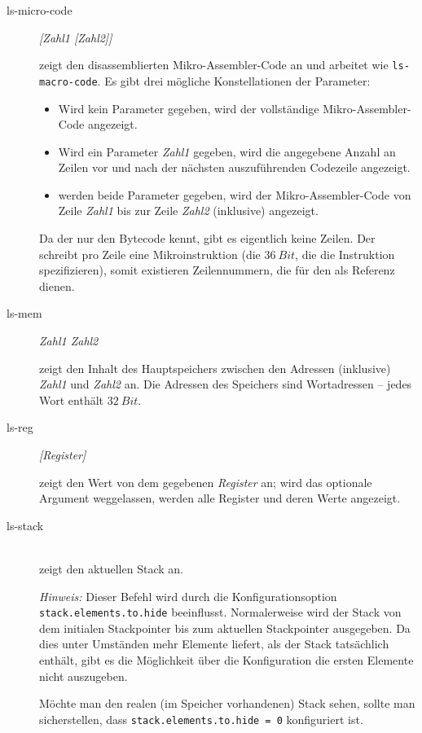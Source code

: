\begin{description}
\item[ls-micro-code] \emph{[Zahl1 [Zahl2]]}

  zeigt den disassemblierten Mikro-Assembler-Code an und arbeitet wie \texttt{ls-macro-code}. Es gibt drei mögliche Konstellationen der Parameter:
  \begin{itemize}
  \item Wird kein Parameter gegeben, wird der vollständige Mikro-Assembler-Code angezeigt.
  \item Wird ein Parameter \emph{Zahl1} gegeben, wird die angegebene Anzahl an Zeilen vor und nach der nächsten auszuführenden Codezeile angezeigt.
  \item werden beide Parameter gegeben, wird der Mikro-Assembler-Code von Zeile \emph{Zahl1} bis zur Zeile \emph{Zahl2} (inklusive) angezeigt.
  \end{itemize}

  Da der \md{} nur den Bytecode kennt, gibt es eigentlich keine Zeilen. Der \md{} schreibt pro Zeile eine Mikroinstruktion (die $36~Bit$, die die Instruktion spezifizieren), somit existieren Zeilennummern, die für den \md{} als Referenz dienen.

\item[ls-mem] \emph{Zahl1 Zahl2}

  zeigt den Inhalt des Hauptspeichers zwischen den Adressen (inklusive) \emph{Zahl1} und \emph{Zahl2} an. Die Adressen des Speichers sind Wortadressen -- jedes Wort enthält $32~Bit$.

\item[ls-reg] \emph{[Register]}

  zeigt den Wert von dem gegebenen \emph{Register} an; wird das optionale Argument weggelassen, werden alle Register und deren Werte angezeigt.

\item[ls-stack] \hspace*{\fill}\\

  zeigt den aktuellen Stack an.

  \emph{Hinweis:} Dieser Befehl wird durch die Konfigurationsoption \texttt{stack.elements.to.hide} beeinflusst. Normalerweise wird der Stack von dem initialen Stackpointer bis zum aktuellen Stackpointer ausgegeben. Da dies unter Umständen mehr Elemente liefert, als der Stack tatsächlich enthält, gibt es die Möglichkeit über die Konfiguration die ersten Elemente nicht auszugeben.

Möchte man den realen (im Speicher vorhandenen) Stack sehen, sollte man sicherstellen, dass \texttt{stack.elements.to.hide = 0} konfiguriert ist.


\end{description}
